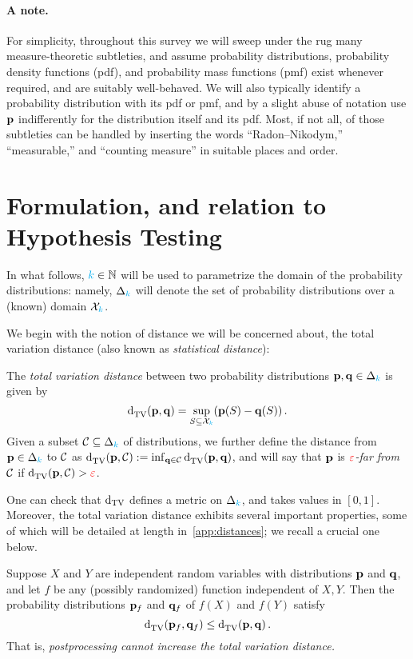 \paragraph{A note.} For simplicity, throughout this survey we will sweep under the rug many measure-theoretic subtleties, and assume probability distributions, probability density functions (pdf), and probability mass functions (pmf) exist whenever required, and are suitably well-behaved. We will also typically identify a probability distribution with its pdf or pmf, and by a slight abuse of notation use $\mathbf{p}$ indifferently for the distribution itself and its pdf. Most, if not all, of those subtleties can be handled by inserting the words ``Radon--Nikodym,'' ``measurable,'' and ``counting measure'' in suitable places and order.

\section{Formulation, and relation to Hypothesis Testing}
\label{sec:formulation}

In what follows, ${\textcolor{cyan}{k}}\in\mathbb{N}$ will be used to parametrize the domain of the probability distributions: namely, $\Delta_{{\textcolor{cyan}{k}}}$ will denote the set of probability distributions over a (known) domain $\mathcal{X}_{\textcolor{cyan}{k}}$.

We begin with the notion of distance we will be concerned about, the total variation distance (also known as \emph{statistical distance}):
\begin{definition}
  \label{def:tv}
  The \emph{total variation distance} between two probability distributions $\mathbf{p},\mathbf{q}\in\Delta_{{\textcolor{cyan}{k}}}$ is given by
  \[
    \totalvardist{\p}{\q} = \sup_{S\subseteq \domain_\ab} (\p(S)-\q(S))\,.
  \]
  Given a subset $\mathcal{C}\subseteq\Delta_{{\textcolor{cyan}{k}}}$ of distributions, we further define the distance from $\mathbf{p}\in\Delta_{{\textcolor{cyan}{k}}}$ to $\mathcal{C}$ as $\totalvardist{\p}{\class} \eqdef \inf_{\q\in\class} \totalvardist{\p}{\q}$, and will say that $\mathbf{p}$ is \emph{$\textcolor{red}{\varepsilon}$-far from $\mathcal{C}$} if $\totalvardist{\p}{\class} > \dst$.
\end{definition}
One can check that $\operatorname{d}_{\rm TV}$ defines a metric on $\Delta_{{\textcolor{cyan}{k}}}$, and takes values in $[0,1]$. Moreover, the total variation distance exhibits several important properties, some of which will be detailed at length in~\cref{app:distances}; we recall a crucial one below.

\begin{fact}
  \label{fact:dpi}
  Suppose $X$ and $Y$ are independent random variables with distributions $\mathbf{p}$ and $\mathbf{q}$, and let $f$ be any (possibly randomized) function independent of $X,Y$. Then the probability distributions $\mathbf{p}_f$ and $\mathbf{q}_f$ of $f(X)$ and $f(Y)$ satisfy
  \[
      \totalvardist{\p_f}{\q_f} \leq \totalvardist{\p}{\q}\,.
  \]
  That is, \emph{postprocessing cannot increase the total variation distance.}
\end{fact}


